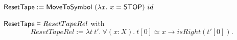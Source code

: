 \begin{definition}[$\MS{ResetTape}$]
  \label{def:Reset}
  $\textsf{ResetTape} := \textsf{MoveToSymbol}~(\lambda x.~x=\textsf{STOP})~id$
\end{definition}

\begin{lemma}
  $\textsf{ResetTape} \vDash ResetTapeRel$ with
  \[
    ResetTapeRel := \lambda t~t'.~\forall(x:X).~t[0] \simeq x \rightarrow isRight(t'[0]).
  \]
\end{lemma}





